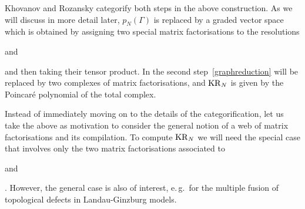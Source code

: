\documentclass{compositio}
\theoremstyle{definition}
\numberwithin{equation}{section}
\begin{document}
Khovanov and Rozansky categorify both steps in the above construction. As we will discuss in more detail later, $p_{N}(\Gamma)$ is replaced by a graded vector space which is obtained by assigning two special matrix factorisations to the resolutions 
\begin{minipage}{0.36cm}
\end{minipage}
 and 
 \begin{minipage}{0.48cm}
\end{minipage} 
and then taking their tensor product. In the second step~\eqref{graphreduction} will be replaced by two complexes of matrix factorisations, and $\operatorname{KR}_{N}$ is given by the Poincar\'e polynomial of the total complex. 

Instead of immediately moving on to the details of the categorification, let us take the above as motivation to consider the general notion of a web of matrix factorisations and its compilation. To compute $\operatorname{KR}_{N}$ we will need the special case that involves only the two matrix factorisations associated to 
\begin{minipage}{0.36cm}
\end{minipage}
 and 
 \begin{minipage}{0.48cm}
\end{minipage}. 
However, the general case is also of interest, e.\,g.~for the multiple fusion of topological defects in Landau-Ginzburg models. 
\end{document}
